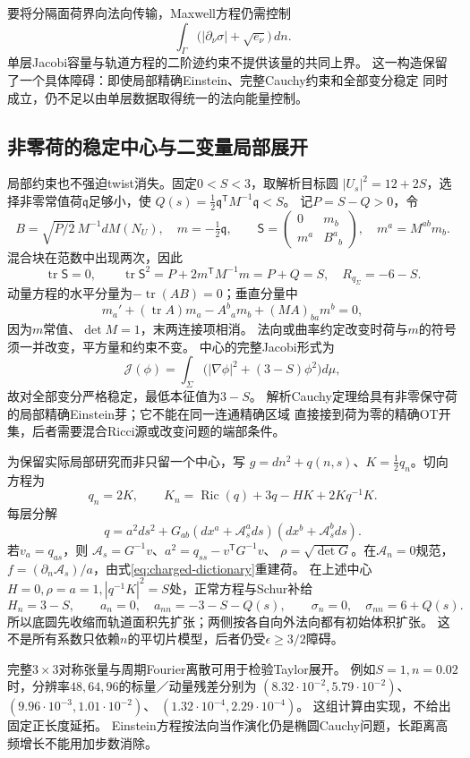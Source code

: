 \documentclass[UTF8,a4paper,11pt,fontset=fandol]{ctexart}
\numberwithin{equation}{section}
\theoremstyle{definition}
\newcommand{\Ric}{\operatorname{Ric}}
\newcommand{\tr}{\operatorname{tr}}
\begin{document}
要将分隔面荷界向法向传输，Maxwell方程仍需控制
\[
 \int_\Gamma\bigl(|\partial_\nu\sigma|+\sqrt{e_\nu}\bigr)\,dn.
\]
单层Jacobi容量与轨道方程的二阶迹约束不提供该量的共同上界。
这一构造保留了一个具体障碍：即使局部精确Einstein、完整Cauchy约束和全部变分稳定
同时成立，仍不足以由单层数据取得统一的法向能量控制。

\subsection{非零荷的稳定中心与二变量局部展开}
局部约束也不强迫twist消失。固定$0<S<3$，取解析目标圆
$|U_s|^2=12+2S$，选择非零常值荷$\mathfrak q$足够小，使
$Q(s)=\frac12\mathfrak q^{\mathsf T}M^{-1}\mathfrak q<S$。
记$P=S-Q>0$，令
\[
 B=\sqrt{P/2}\,M^{-1}dM(N_U),\quad m=-\tfrac12\mathfrak q,
 \qquad
 \mathsf S=\begin{pmatrix}0&m_b\\m^a&B^a{}_b\end{pmatrix},
 \quad m^a=M^{ab}m_b.
\]
混合块在范数中出现两次，因此
\[
 \tr\mathsf S=0,\qquad\tr\mathsf S^2=P+2m^{\mathsf T}M^{-1}m=P+Q=S,
 \quad R_{q_\Sigma}=-6-S.
\]
动量方程的水平分量为$-\tr(AB)=0$；垂直分量中
\[
 m_a'+(\tr A)m_a-A^b{}_am_b+(MA)_{ba}m^b=0,
\]
因为$m$常值、$\det M=1$，末两连接项相消。
法向或曲率约定改变时荷与$m$的符号须一并改变，平方量和约束不变。
中心的完整Jacobi形式为
\[
 \mathcal J(\phi)=\int_\Sigma
       \bigl(|\nabla\phi|^2+(3-S)\phi^2\bigr)d\mu,
\]
故对全部变分严格稳定，最低本征值为$3-S$。
解析Cauchy定理给具有非零保守荷的局部精确Einstein芽；它不能在同一连通精确区域
直接接到荷为零的精确OT开集，后者需要混合Ricci源或改变问题的端部条件。

为保留实际局部研究而非只留一个中心，写
$g=dn^2+q(n,s)$、$K=\frac12q_n$。切向方程为
\[
 q_n=2K,\qquad K_n=\Ric(q)+3q-HK+2Kq^{-1}K.
\]
每层分解
\[
 q=a^2ds^2+G_{ab}(dx^a+\mathcal A_s^a ds)(dx^b+\mathcal A_s^b ds).
\]
若$v_a=q_{as}$，则
$\mathcal A_s=G^{-1}v$、$a^2=q_{ss}-v^{\mathsf T}G^{-1}v$、
$\rho=\sqrt{\det G}$。在$\mathcal A_n=0$规范，
$f=(\partial_n\mathcal A_s)/a$，由式\eqref{eq:charged-dictionary}重建荷。
在上述中心$H=0,\rho=a=1,|q^{-1}K|^2=S$处，正常方程与Schur补给
\begin{equation}\label{eq:charged-taylor}
 H_n=3-S,\qquad a_n=0,\quad a_{nn}=-3-S-Q(s),
 \qquad\sigma_n=0,\quad\sigma_{nn}=6+Q(s).
\end{equation}
所以底圆先收缩而轨道面积先扩张；两侧按各自向外法向都有初始体积扩张。
这不是所有系数只依赖$n$的平切片模型，后者仍受$\epsilon\ge3/2$障碍。

完整$3\times3$对称张量与周期Fourier离散可用于检验Taylor展开。
例如$S=1,n=0.02$时，分辨率$48,64,96$的标量／动量残差分别为
$(8.32\cdot10^{-2},5.79\cdot10^{-2})$、
$(9.96\cdot10^{-3},1.01\cdot10^{-2})$、
$(1.32\cdot10^{-4},2.29\cdot10^{-4})$。
这组计算由实现，不给出固定正长度延拓。
Einstein方程按法向当作演化仍是椭圆Cauchy问题，长距离高频增长不能用加步数消除。
\end{document}
